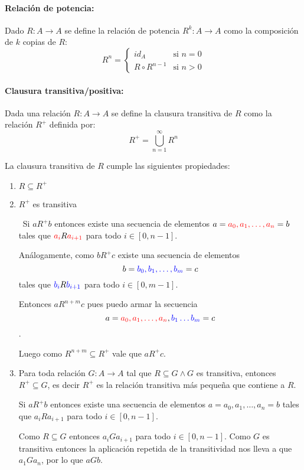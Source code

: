\paragraph{Relación de potencia:} Dado \(R: A\to A\) se define la relación de potencia \(R^k: A\to A\) como la composición de \(k\) copias de \(R\):
\[R^n = \left\{
  \begin{array}{ll}
    id_A           & \text{si } n = 0 \\
    R\circ R^{n-1} & \text{si } n > 0
  \end{array}
  \right.
\]

\paragraph{Clausura transitiva/positiva:} Dada una relación \(R:A\to A\) se define la clausura transitiva de \(R\) como la relación \(R^+\) definida por: \[R^+ = \bigcup_{n=1}^\infty R^n\]

La clausura transitiva de \(R\) cumple las siguientes propiedades:
\begin{enumerate}
  \item \(R\subseteq R^+\)
        \newpage
  \item \(R^+\) es transitiva
        \begin{demo}[0.8\textwidth]
          ~Si \(a R^+ b\) entonces existe una secuencia de elementos \(a = {\color{red}a_0, a_1, \dots, a_n} = b\) tales que \({\color{red}a_i} R {\color{red}a_{i+1}}\) para todo \(i\in [0,n-1]\).

          \vspace*{0.25cm}
          Análogamente, como \(b R^+ c\) existe una secuencia de elementos \[b = {\color{blue}b_0, b_1, \dots, b_m} = c\] tales que \({\color{blue}b_i} R {\color{blue}b_{i+1}}\) para todo \(i\in [0,m-1]\).

          \vspace*{0.25cm}
          Entonces \(a R^{n+m} c\) pues puedo armar la secuencia \[a = {\color{red}a_0, a_1, \dots, a_n},{\color{blue}b_1\dots b_m} = c\].

          \vspace*{0.25cm}
          Luego como \(R^{n+m}\subseteq R^+\) vale que \(a R^+ c\).
        \end{demo}

  \item Para toda relación \(G:A\to A\) tal que \(R\subseteq G \land G\) es transitiva, entonces \(R^+\subseteq G\), es decir \(R^+\) es la relación transitiva más pequeña que contiene a \(R\).
        \begin{demo}[0.8\textwidth]
          Si \(a R^+ b\) entonces existe una secuencia de elementos \(a = a_0, a_1, \dots, a_n = b\) tales que \(a_i R a_{i+1}\) para todo \(i\in [0,n-1]\).

          \vspace*{0.25cm}
          Como \(R\subseteq G\) entonces \(a_i G a_{i+1}\) para todo \(i\in [0,n-1]\). Como \(G\) es transitiva entonces la aplicación repetida de la transitividad nos lleva a que \(a_1 G a_n\), por lo que \(a G b\).
        \end{demo}
\end{enumerate}

